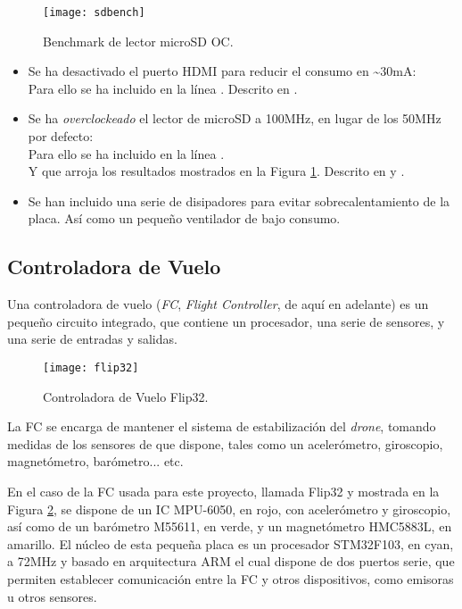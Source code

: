 \begin{figure}
	\centering
	\texttt{[image: sdbench]}
	\caption{Benchmark de lector microSD OC.}\label{fig:sdbenchmark}
\end{figure}

\begin{itemize}
\item Se ha desactivado el puerto HDMI para reducir el consumo en \textasciitilde{}30mA: \\Para ello se ha incluido en  la línea . Descrito en \citep{wiki:PowerSaving}.
\item Se ha \emph{overclockeado} el lector de microSD a 100MHz, en lugar de los 50MHz por defecto: \\Para ello se ha incluido en  la línea .\\Y que arroja los resultados mostrados en la Figura \ref{fig:sdbenchmark}. Descrito en \citep{wiki:OCSD} y \citep{wiki:OCSDWifiFix}.
\item Se han incluido una serie de disipadores para evitar sobrecalentamiento de la placa. Así como un pequeño ventilador de bajo consumo.
\end{itemize} 


\subsection{Controladora de Vuelo}

Una controladora de vuelo (\textit{FC}, \emph{Flight Controller}, de aquí en adelante) es un pequeño circuito integrado, que contiene un procesador, una serie de sensores, y una serie de entradas y salidas. 
\begin{figure}
\centering
\texttt{[image: flip32]}
\caption{Controladora de Vuelo Flip32.}\label{fig:fc}
\end{figure}
La FC se encarga de mantener el sistema de estabilización del \emph{drone}, tomando medidas de los sensores de que dispone, tales como un acelerómetro, giroscopio, magnetómetro, barómetro... etc. 

En el caso de la FC usada para este proyecto, llamada Flip32 y mostrada en la Figura  \ref{fig:fc}, se dispone de un IC MPU-6050, en rojo, con acelerómetro y giroscopio, así como de un barómetro M55611, en verde, y un magnetómetro HMC5883L, en amarillo.
El núcleo de esta pequeña placa es un procesador STM32F103, en cyan, a 72MHz y basado en arquitectura ARM el cual dispone de dos puertos serie, que permiten establecer comunicación entre la FC y otros dispositivos, como emisoras u otros sensores.

